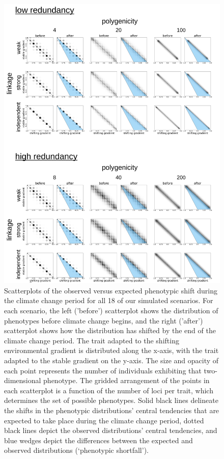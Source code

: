 \documentclass[9pt,twoside,lineno]{pnas-new}
\begin{document}
\begin{figure}
\centering
\includegraphics[width=.8\linewidth]{pub/figs_and_stats/FIG_S3_phenotypic_shift_null.jpg}
    \caption{Scatterplots of the observed versus expected phenotypic shift during the climate change period for all 18 of our simulated scenarios. For each scenario, the left (’before’) scatterplot shows the distribution of phenotypes before climate change begins, and the right (’after’) scatterplot shows how the distribution has shifted by the end of the climate change period. The trait adapted to the shifting environmental gradient is distributed along the x-axis, with the trait adapted to the stable gradient on the y-axis. The size and opacity of each point represents the number of individuals exhibiting that two-dimensional phenotype. The gridded arrangement of the points in each scatterplot is a function of the number of loci per trait, which determines the set of possible phenotypes. Solid black lines delineate the shifts in the phenotypic distributions’ central tendencies that are expected to take place during the climate change period, dotted black lines depict the observed distributions’ central tendencies, and blue wedges depict the differences between the expected and observed distributions (‘phenotypic shortfall’).}
\label{fig:fig_s3}
\end{figure}
\end{document}
